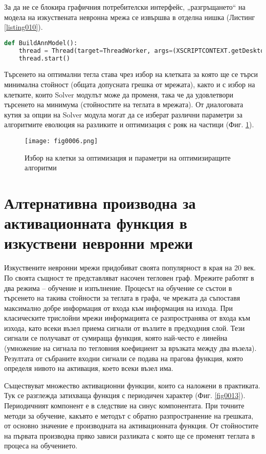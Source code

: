 За да не се блокира графичния потребителски интерфейс, „разгръщането“ на модела на изкуствената невронна мрежа се извършва в отделна нишка (Листинг \ref{listing010}).

\begin{lstlisting}[caption=Изпълнение с отделна нишка, language=Python, basicstyle=\tiny, label=listing010]
def BuildAnnModel():
    thread = Thread(target=ThreadWorker, args=(XSCRIPTCONTEXT.getDesktop(),))
    thread.start()
\end{lstlisting}

Търсенето на оптимални тегла става чрез избор на клетката за която ще се търси минимална стойност (общата допусната грешка от мрежата), както и с избор на клетките, които Solver модулът може да променя, така че да удовлетвори търсенето на минимума (стойностите на теглата в мрежата). От диалоговата кутия за опции на Solver модула могат да се изберат различни параметри за алгоритмите еволюция на разликите и оптимизация с рояк на частици (Фиг. \ref{fig006}).

\begin{figure}[H]
  \centering
  \texttt{[image: fig0006.png]}
  \caption{Избор на клетки за оптимизация и параметри на оптимизиращите алгоритми}
\label{fig006}
\end{figure}

\section{Алтернативна производна за активационната функция в изкуствени невронни мрежи}

Изкуствените невронни мрежи придобиват своята популярност в края на 20 век. По своята същност те представляват насочен тегловен граф. Мрежите работят в два режима – обучение и изпълнение. Процесът на обучение се състои в търсенето на такива стойности за теглата в графа, че мрежата да съпоставя максимално добре информация от входа към информация на изхода. При класическите трислойни мрежи информацията се разпространява от входа към изхода, като всеки възел приема сигнали от възлите в предходния слой. Тези сигнали се получават от сумираща функция, която най-често е линейна (умножение на сигнала по тегловния коефициент за връзката между два възела). Резултата от събраните входни сигнали се подава на прагова функция, която определя нивото на активация, което всеки възел има.

Съществуват множество активационни функции, които са наложени в практиката. Тук се разглежда затихваща функция с периодичен характер (Фиг. \ref{fig0013}). Периодичният компонент е в следствие на синус компонентата. При точните методи за обучение, какъвто е методът с обратно разпространение на грешката, от основно значение е производната на активационната функция. От стойностите на първата производна пряко зависи разликата с която ще се променят теглата в процеса на обучението.

